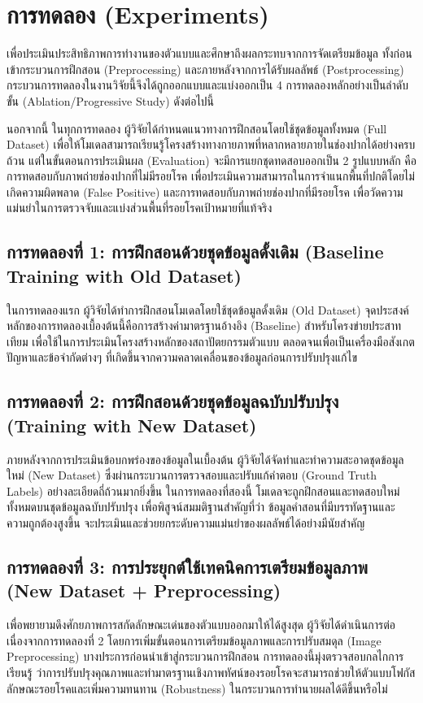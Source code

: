 \section{การทดลอง (Experiments)}

เพื่อประเมินประสิทธิภาพการทำงานของตัวแบบและศึกษาถึงผลกระทบจากการจัดเตรียมข้อมูล ทั้งก่อนเข้ากระบวนการฝึกสอน (Preprocessing) และภายหลังจากการได้รับผลลัพธ์ (Postprocessing) กระบวนการทดลองในงานวิจัยนี้จึงได้ถูกออกแบบและแบ่งออกเป็น 4 การทดลองหลักอย่างเป็นลำดับขั้น (Ablation/Progressive Study) ดังต่อไปนี้

นอกจากนี้ ในทุกการทดลอง ผู้วิจัยได้กำหนดแนวทางการฝึกสอนโดยใช้ชุดข้อมูลทั้งหมด (Full Dataset) เพื่อให้โมเดลสามารถเรียนรู้โครงสร้างทางกายภาพที่หลากหลายภายในช่องปากได้อย่างครบถ้วน แต่ในขั้นตอนการประเมินผล (Evaluation) จะมีการแยกชุดทดสอบออกเป็น 2 รูปแบบหลัก คือ การทดสอบกับภาพถ่ายช่องปากที่ไม่มีรอยโรค เพื่อประเมินความสามารถในการจำแนกพื้นที่ปกติโดยไม่เกิดความผิดพลาด (False Positive) และการทดสอบกับภาพถ่ายช่องปากที่มีรอยโรค เพื่อวัดความแม่นยำในการตรวจจับและแบ่งส่วนพื้นที่รอยโรคเป้าหมายที่แท้จริง

\subsection{การทดลองที่ 1: การฝึกสอนด้วยชุดข้อมูลดั้งเดิม (Baseline Training with Old Dataset)}
ในการทดลองแรก ผู้วิจัยได้ทำการฝึกสอนโมเดลโดยใช้ชุดข้อมูลดั้งเดิม (Old Dataset) จุดประสงค์หลักของการทดลองเบื้องต้นนี้คือการสร้างค่ามาตรฐานอ้างอิง (Baseline) สำหรับโครงข่ายประสาทเทียม เพื่อใช้ในการประเมินโครงสร้างหลักของสถาปัตยกรรมตัวแบบ ตลอดจนเพื่อเป็นเครื่องมือสังเกตปัญหาและข้อจำกัดต่างๆ ที่เกิดขึ้นจากความคลาดเคลื่อนของข้อมูลก่อนการปรับปรุงแก้ไข

\subsection{การทดลองที่ 2: การฝึกสอนด้วยชุดข้อมูลฉบับปรับปรุง (Training with New Dataset)}
ภายหลังจากการประเมินข้อบกพร่องของข้อมูลในเบื้องต้น ผู้วิจัยได้จัดทำและทำความสะอาดชุดข้อมูลใหม่ (New Dataset) ซึ่งผ่านกระบวนการตรวจสอบและปรับแก้คำตอบ (Ground Truth Labels) อย่างละเอียดถี่ถ้วนมากยิ่งขึ้น ในการทดลองที่สองนี้ โมเดลจะถูกฝึกสอนและทดสอบใหม่ทั้งหมดบนชุดข้อมูลฉบับปรับปรุง เพื่อพิสูจน์สมมติฐานสำคัญที่ว่า ข้อมูลคำสอนที่มีบรรทัดฐานและความถูกต้องสูงขึ้น จะประเมินและช่วยยกระดับความแม่นยำของผลลัพธ์ได้อย่างมีนัยสำคัญ

\subsection{การทดลองที่ 3: การประยุกต์ใช้เทคนิคการเตรียมข้อมูลภาพ (New Dataset + Preprocessing)}
เพื่อพยายามดึงศักยภาพการสกัดลักษณะเด่นของตัวแบบออกมาให้ได้สูงสุด ผู้วิจัยได้ดำเนินการต่อเนื่องจากการทดลองที่ 2 โดยการเพิ่มขั้นตอนการเตรียมข้อมูลภาพและการปรับสมดุล (Image Preprocessing) บางประการก่อนนำเข้าสู่กระบวนการฝึกสอน การทดลองนี้มุ่งตรวจสอบกลไกการเรียนรู้ ว่าการปรับปรุงคุณภาพและทำมาตรฐานเชิงภาพทัศน์ของรอยโรคจะสามารถช่วยให้ตัวแบบโฟกัสลักษณะรอยโรคและเพิ่มความทนทาน (Robustness) ในกระบวนการทำนายผลได้ดีขึ้นหรือไม่


